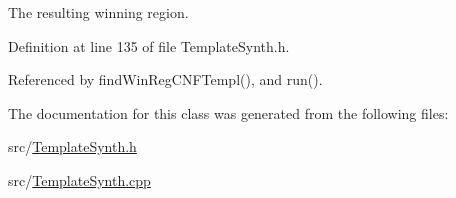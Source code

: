 The resulting winning region. 



Definition at line 135 of file Template\-Synth.\-h.



Referenced by find\-Win\-Reg\-C\-N\-F\-Templ(), and run().



The documentation for this class was generated from the following files\-:\begin{DoxyCompactItemize}
\item 
src/\hyperlink{TemplateSynth_8h}{Template\-Synth.\-h}\item 
src/\hyperlink{TemplateSynth_8cpp}{Template\-Synth.\-cpp}\end{DoxyCompactItemize}
